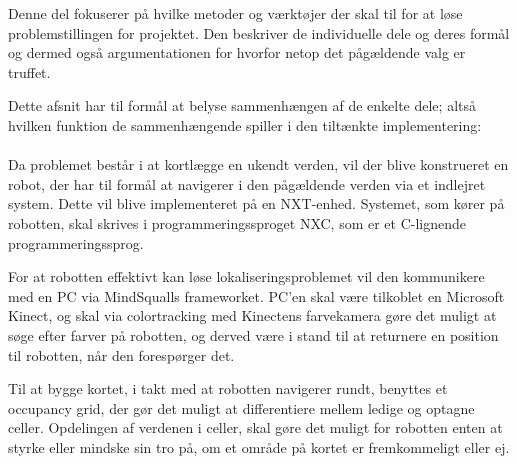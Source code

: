 Denne del fokuserer på hvilke metoder og værktøjer der skal til for at løse problemstillingen for projektet.
Den beskriver de individuelle dele og deres formål og dermed også argumentationen for hvorfor netop det pågældende valg er truffet.

Dette afsnit har til formål at belyse sammenhængen af de enkelte dele; altså hvilken funktion de sammenhængende spiller i den tiltænkte implementering:
\\
\\
Da problemet består i at kortlægge en ukendt verden, vil der blive konstrueret en robot, der har til formål at navigerer i den pågældende verden via et indlejret system.
Dette vil blive implementeret på en NXT-enhed.
Systemet, som kører på robotten, skal skrives i programmeringssproget NXC, som er et C-lignende programmeringssprog.

For at robotten effektivt kan løse lokaliseringsproblemet vil den kommunikere med en PC via MindSqualls frameworket.
PC'en skal være tilkoblet en Microsoft Kinect, og skal via colortracking med Kinectens farvekamera gøre det muligt at søge efter farver på robotten, og derved være i stand til at returnere en position til robotten, når den forespørger det.

Til at bygge kortet, i takt med at robotten navigerer rundt, benyttes et occupancy grid, der gør det muligt at differentiere mellem ledige og optagne celler.
Opdelingen af verdenen i celler, skal gøre det muligt for robotten enten at styrke eller mindske sin tro på, om et område på kortet er fremkommeligt eller ej.